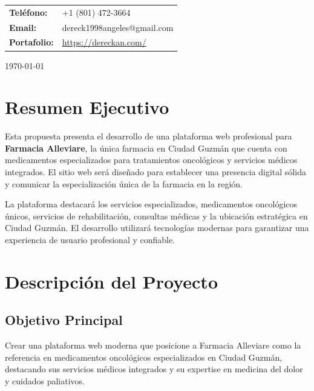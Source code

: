 \documentclass[12pt,a4paper]{article}
\begin{document}
\begin{titlepage}
\begin{center}
{\begin{minipage}{0.8\textwidth}
        \vspace{0.3cm}
        
        \begin{tabular}{ll}
            \textbf{Teléfono:} & +1 (801) 472-3664 \\
            \textbf{Email:} & dereck1998angeles@gmail.com \\
            \textbf{Portafolio:} & \url{https://dereckan.com/} \\
        \end{tabular}
        
        \vspace{0.5cm}
    \end{minipage}}
    \end{center}
    
    \vspace{2cm}
    
    {\large\textcolor{grisclaro}{\today}}
    
\end{titlepage}

\newpage

\section{Resumen Ejecutivo}

Esta propuesta presenta el desarrollo de una plataforma web profesional para \textbf{Farmacia Alleviare}, la única farmacia en Ciudad Guzmán que cuenta con medicamentos especializados para tratamientos oncológicos y servicios médicos integrados. El sitio web será diseñado para establecer una presencia digital sólida y comunicar la especialización única de la farmacia en la región.

La plataforma destacará los servicios especializados, medicamentos oncológicos únicos, servicios de rehabilitación, consultas médicas y la ubicación estratégica en Ciudad Guzmán. El desarrollo utilizará tecnologías modernas para garantizar una experiencia de usuario profesional y confiable.

\section{Descripción del Proyecto}

\subsection{Objetivo Principal}
Crear una plataforma web moderna que posicione a Farmacia Alleviare como la referencia en medicamentos oncológicos especializados en Ciudad Guzmán, destacando sus servicios médicos integrados y su expertise en medicina del dolor y cuidados paliativos.
\end{document}
